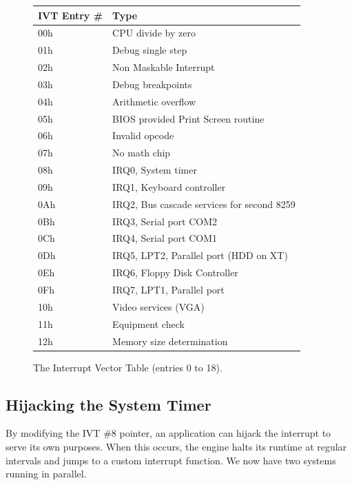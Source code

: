 \documentclass[book.tex]{subfiles}
\begin{document}
\begin{figure}[H]
	\centering
	\begin{tabularx}{\textwidth}{ l p{}  }
	  \toprule
	  \textbf{IVT Entry \#} & \textbf{Type} \\ \bottomrule

	  00h	&	CPU divide by zero \\
01h	&	Debug single step \\
02h	&	Non Maskable Interrupt \\
03h	&	Debug breakpoints \\
04h	&	Arithmetic overflow \\
05h	&	BIOS provided Print Screen routine \\
06h	&	Invalid opcode \\
07h	&	No math chip \\
08h & IRQ0, System timer \\
09h & IRQ1, Keyboard controller \\
0Ah & IRQ2, Bus cascade services for second 8259 \\
0Bh & IRQ3, Serial port COM2 \\ 
0Ch & IRQ4, Serial port COM1 \\
0Dh & IRQ5, LPT2, Parallel port (HDD on XT) \\
0Eh & IRQ6, Floppy Disk Controller \\
0Fh & IRQ7, LPT1, Parallel port \\
10h & Video services (VGA)\\
11h & Equipment check \\
12h & Memory size determination \\
		\bottomrule
	\end{tabularx}
	\caption{The Interrupt Vector Table (entries 0 to 18).}
\end{figure}

\subsection{Hijacking the System Timer}
By modifying the IVT \#8 pointer, an application can hijack the interrupt to serve its own purposes. When this occurs, the engine halts its runtime at regular intervals and jumps to a custom interrupt function. We now have two systems running in parallel.\\

\par
\begin{minipage}{\textwidth}

\end{minipage}\\
\end{document}

